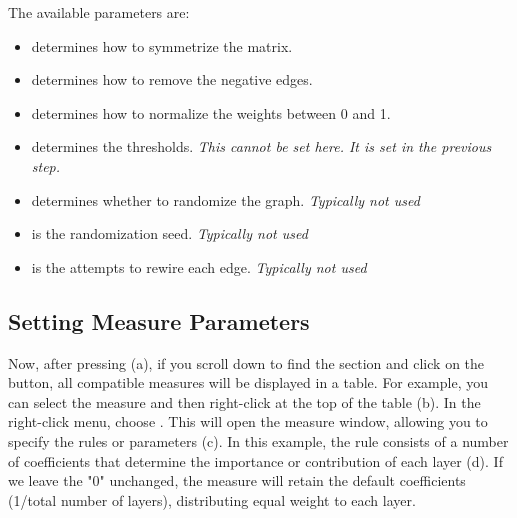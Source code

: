 \documentclass[justified]{tufte-handout}
\begin{document}
The available parameters are:
\begin{itemize}

\item {} determines how to symmetrize the matrix.

\item {} determines how to remove the negative edges.

\item {} determines how to normalize the weights between 0 and 1.

\item {} determines the thresholds. \emph{This cannot be set here. It is set in the previous step.}

\item {} determines whether to randomize the graph. \emph{Typically not used}

\item {} is the randomization seed. \emph{Typically not used}

\item {} is the attempts to rewire each edge. \emph{Typically not used}

\end{itemize}

\subsection{Setting Measure Parameters}

Now, after pressing  (a), if you scroll down to find the  section and click on the  button, all compatible measures will be displayed in a table. 
For example, you can select the  measure and then right-click at the top of the table (b). In the right-click menu, choose . 
This will open the measure window, allowing you to specify the rules or parameters (c). In this example, the rule consists of a number of coefficients that determine the importance or contribution of each layer (d). If we leave the "0" unchanged, the measure will retain the default coefficients (1/total number of layers), distributing equal weight to each layer.
\end{document}
